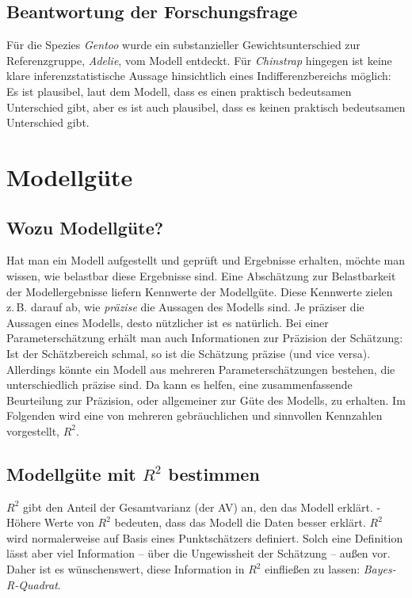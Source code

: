 \documentclass[
  ngerman,
  letterpaper,
  twoside,
  open=any]{scrbook}
\theoremstyle{definition}
\theoremstyle{plain}
\theoremstyle{definition}
\theoremstyle{definition}
\theoremstyle{definition}
\theoremstyle{definition}
\theoremstyle{remark}
\begin{document}
\subsection{Beantwortung der
Forschungsfrage}\label{beantwortung-der-forschungsfrage}

Für die Spezies \emph{Gentoo} wurde ein substanzieller
Gewichtsunterschied zur Referenzgruppe, \emph{Adelie}, vom Modell
entdeckt. Für \emph{Chinstrap} hingegen ist keine klare
inferenzstatistische Aussage hinsichtlich eines Indifferenzbereichs
möglich: Es ist plausibel, laut dem Modell, dass es einen praktisch
bedeutsamen Unterschied gibt, aber es ist auch plausibel, dass es keinen
praktisch bedeutsamen Unterschied gibt.

\section{Modellgüte}\label{modellguxfcte}

\subsection{Wozu Modellgüte?}\label{wozu-modellguxfcte}

Hat man ein Modell aufgestellt und geprüft und Ergebnisse erhalten,
möchte man wissen, wie belastbar diese Ergebnisse sind. Eine Abschätzung
zur Belastbarkeit der Modellergebnisse liefern Kennwerte der Modellgüte.
Diese Kennwerte zielen z.\,B. darauf ab, wie \emph{präzise} die Aussagen
des Modells sind. Je präziser die Aussagen eines Modells, desto
nützlicher ist es natürlich. Bei einer Parameterschätzung erhält man
auch Informationen zur Präzision der Schätzung: Ist der Schätzbereich
schmal, so ist die Schätzung präzise (und vice versa). Allerdings könnte
ein Modell aus mehreren Parameterschätzungen bestehen, die
unterschiedlich präzise sind. Da kann es helfen, eine zusammenfassende
Beurteilung zur Präzision, oder allgemeiner zur Güte des Modells, zu
erhalten. Im Folgenden wird eine von mehreren gebräuchlichen und
sinnvollen Kennzahlen vorgestellt, \(R^2\).

\subsection{\texorpdfstring{Modellgüte mit \(R^2\)
bestimmen}{Modellgüte mit R\^{}2 bestimmen}}\label{modellguxfcte-mit-r2-bestimmen}

\(R^2\) gibt den Anteil der Gesamtvarianz (der AV) an, den das Modell
erklärt. - Höhere Werte von \(R^2\) bedeuten, dass das Modell die Daten
besser erklärt. \(R^2\) wird normalerweise auf Basis eines
Punktschätzers definiert. Solch eine Definition lässt aber viel
Information -- über die Ungewissheit der Schätzung -- außen vor. Daher
ist es wünschenswert, diese Information in \(R^2\) einfließen zu lassen:
\emph{Bayes-R-Quadrat}.
\end{document}
